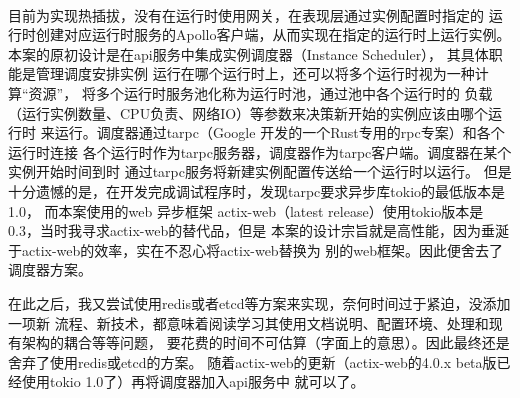 \begin{keturon}
    \paragraph{} 目前为实现热插拔，没有在运行时使用网关，在表现层通过实例配置时指定的
    运行时创建对应运行时服务的Apollo客户端，从而实现在指定的运行时上运行实例。
    本案的原初设计是在api服务中集成实例调度器（Instance Scheduler），
    其具体职能是管理调度安排实例
    运行在哪个运行时上，还可以将多个运行时视为一种计算“资源”，
    将多个运行时服务池化称为运行时池，通过池中各个运行时的
    负载（运行实例数量、CPU负责、网络IO）等参数来决策新开始的实例应该由哪个运行时
    来运行。调度器通过tarpc（Google 开发的一个Rust专用的rpc专案）和各个运行时连接
    各个运行时作为tarpc服务器，调度器作为tarpc客户端。调度器在某个实例开始时间到时
    通过tarpc服务将新建实例配置传送给一个运行时以运行。
    但是十分遗憾的是，在开发完成调试程序时，发现tarpc要求异步库tokio的最低版本是1.0，
    而本案使用的web 异步框架
    actix-web（latest release）使用tokio版本是0.3，当时我寻求actix-web的替代品，但是
    本案的设计宗旨就是高性能，因为垂涎于actix-web的效率，实在不忍心将actix-web替换为
    别的web框架。因此便舍去了调度器方案。

    在此之后，我又尝试使用redis或者etcd等方案来实现，奈何时间过于紧迫，没添加一项新
    流程、新技术，都意味着阅读学习其使用文档说明、配置环境、处理和现有架构的耦合等等问题，
    要花费的时间不可估算（字面上的意思）。因此最终还是舍弃了使用redis或etcd的方案。
    随着actix-web的更新（actix-web的4.0.x beta版已经使用tokio 1.0了）再将调度器加入api服务中
    就可以了。


\end{keturon}